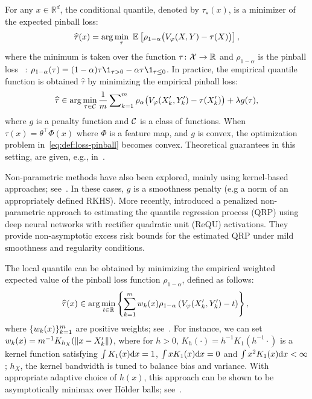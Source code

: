 \label{subsec:tau_qr}
  For any \(x \in \mathbb{R}^d\), the conditional quantile, denoted by \(\tau_{\star}(x)\), is a minimizer of the expected pinball loss:
  \begin{equation}
  \label{eq:def:loss-x-unconditional}
    \widehat{\tau}(x) = \arg\min_{\tau} \ \E\br{\rho_{1-\alpha}\prbig{V_{\varphi}(X,Y) - \tau(X)}},
  \end{equation}
  where the minimum is taken over the function $\tau\colon \mathcal{X} \to \mathbb{R}$ and \(\rho_{1-\alpha}\)        is the pinball loss ~\cite{koenker1978regression,koenker2001quantile}: $\rho_{1-\alpha}(\tau)=(1-\alpha) \tau \1_{\tau > 0} - \alpha \tau \1_{\tau\le 0}$.
  In practice, the empirical quantile function is obtained \(\widehat{\tau}\) by minimizing the empirical pinball loss:
  \begin{equation}\label{eq:def:loss-pinball}
    \widehat{\tau} \in \arg\min_{\tau \in \mathcal{C}} \frac{1}{m} \sum\nolimits_{k=1}^{m} \rho_\alpha \bigl(V_{\varphi}(X_k', Y_k') - \tau(X_k')\bigr) + \lambda g(\tau),
  \end{equation}
  where $g$ is a penalty function and $\mathcal{C}$ is a class of functions. When $\tau(x) = \theta^{\top} \Phi(x)$  where $\Phi$ is a feature map, and $g$ is convex, the optimization problem in~\eqref{eq:def:loss-pinball} becomes convex. Theoretical guarantees in this setting, are given, e.g., in~\cite{chen2005computational,koenker2005quantile}.

  Non-parametric methods have also been explored, mainly using kernel-based approaches; see~\cite{christmann2008consistency}. In these cases, $g$ is a smoothness penalty (e.g a norm of an appropriately defined RKHS). More recently, \citet{shen2024nonparametric} introduced a penalized non-parametric approach to estimating the quantile regression process (QRP) using deep neural networks with rectifier quadratic unit (ReQU) activations. They provide  non-asymptotic excess risk bounds for the estimated QRP under mild smoothness and regularity conditions.

\label{subsec:tau_local}
  The local quantile can be obtained by minimizing the empirical weighted expected value of the pinball loss function \(\rho_{1-\alpha}\), defined as follows:
  \begin{equation}\label{eq:def:reg-tau}
    \!\! \widehat{\tau}(x) \in \arg\underset{t\in\mathbb{R}}{\min} \left\{{\sum_{k=1}^{m} w_{k}(x) \rho_{1-\alpha}\left({V_{\varphi}(X_{k}',Y_{k}')-t}\right)}\right\},
  \end{equation}
  where $\{w_{k}(x)\}_{k=1}^{m}$ are positive weights; see~\cite{bhattacharya1990kernel}. 
  For instance, we can set $w_{k}(x)=m^{-1} K_{h_{X}}(\|x-X_{k}'\|)$, where for $h > 0$, $K_{h}(\cdot)= h^{-1} K_1(h^{-1} \cdot)$ is a kernel function satisfying $\int K_1(x) \mathrm{d} x=1$, $\int x K_1(x) \mathrm{d} x= 0$ and $\int x^2 K_1(x) \mathrm{d} x < \infty$; $h_{X}$, the kernel bandwidth is tuned to balance bias and variance. With appropriate adaptive choice of $h(x)$, this approach can be shown to be asymptotically minimax over H\"older balls; see~\cite{bhattacharya1990kernel,spokoiny2013local,reiss2009pointwise}.
